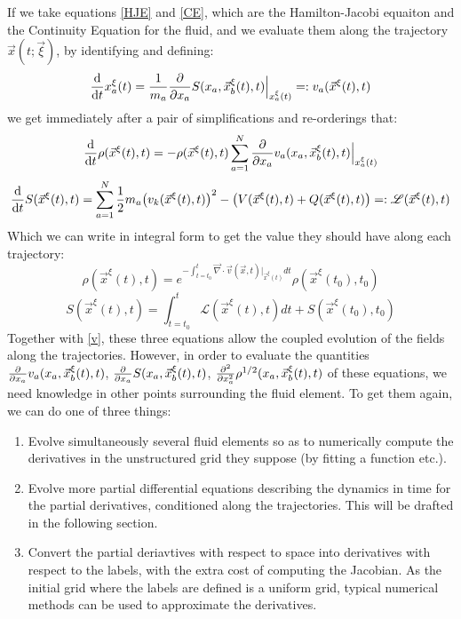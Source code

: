 \documentclass[11pt, a4paper]{article} %
\newcommand{\Lg}{\mathscr{L}}
\begin{document}
If we take equations \eqref{HJE} and \eqref{CE}, which are the Hamilton-Jacobi equaiton and the Continuity Equation for the fluid, and we evaluate them along the trajectory $\vec{x}(t;\vec{\xi})$, by identifying and defining:
\begin{equation}\label{v}
\dv{}{t}x_a^\xi(t)=\frac{1}{m_a}\pdv{}{x_a}S(x_a, \vec{x}_b^\xi(t),t)\Big\rvert_{x^\xi_a(t)}=:v_a(\vec{x}^\xi(t),t)
\end{equation}
we get immediately after a pair of simplifications and re-orderings that:
\begin{equation}\label{CE.L}
\dv{}{t}\rho(\vec{x}^\xi(t),t)=-\rho(\vec{x}^\xi(t),t)\sum_{a=1}^N\pdv{}{x_a} v_a(x_a, \vec{x}_b^\xi(t),t)\Big\rvert_{x_a^\xi(t)}
\end{equation}
\begin{equation}\label{HJE.L}
\dv{}{t}S(\vec{x}^\xi(t),t)=  \sum_{a=1}^N \frac{1}{2} m_a \qty(v_k(\vec{x}^\xi(t),t) )^2 - \qty(V(\vec{x}^\xi(t),t)+ Q(\vec{x}^\xi(t),t))=: \Lg(\vec{x}^\xi(t),t)
\end{equation}
Which we can write in integral form to get the value they should have along each trajectory:
\begin{equation}\label{JacPre}
\rho(\vec{x}^\xi(t),t)=e^{-\int_{t=t_0}^t \vec{\nabla}\cdot \vec{v}(\vec{x},t)\rvert_{\vec{x}^\xi(t)} dt}\rho(\vec{x}^\xi(t_0),t_0)
\end{equation}
\begin{equation}
S(\vec{x}^\xi(t),t)=\int_{t=t_0}^t \Lg(\vec{x}^\xi(t),t) dt+S(\vec{x}^\xi(t_0),t_0)
\end{equation}
Together with \eqref{v}, these three equations allow the coupled evolution of the fields along the trajectories. However, in order to evaluate the quantities $\pdv{}{x_a} v_a(x_a, \vec{x}_b^\xi(t),t)$, $\pdv{}{x_a}S(x_a, \vec{x}_b^\xi(t),t)$, $\pdv[2]{}{x_a}\rho^{1/2}(x_a, \vec{x}_b^\xi(t),t)$ of these equations, we need knowledge in other points surrounding the fluid element. To get them again, we can do one of three things:
\begin{enumerate}
\item Evolve simultaneously several fluid elements so as to numerically compute the derivatives in the unstructured grid they suppose (by fitting a function etc.).
\item Evolve more partial differential equations describing the dynamics in time for the partial derivatives, conditioned along the trajectories. This will be drafted in the following section.
\item Convert the partial deriavtives with respect to space into derivatives with respect to the labels, with the extra cost of computing the Jacobian. As the initial grid where the labels are defined is a uniform grid, typical numerical methods can be used to approximate the derivatives. 
\end{enumerate}
\end{document}
